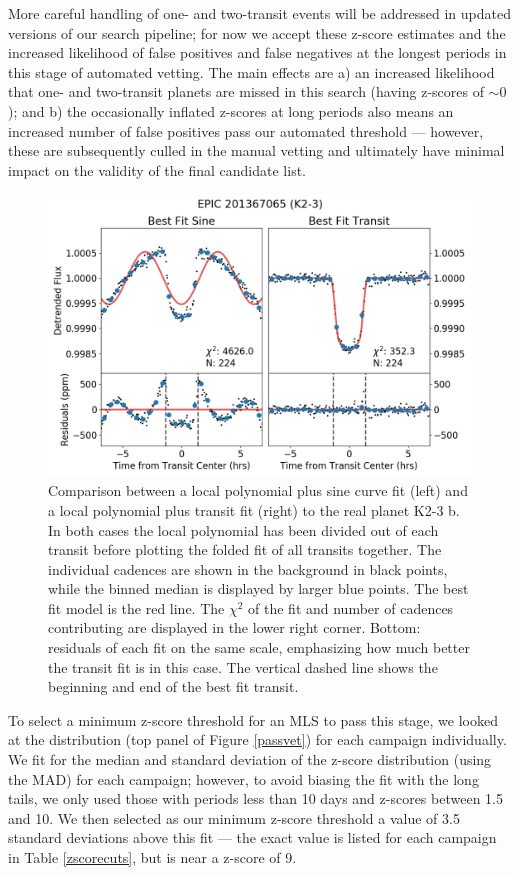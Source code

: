 \documentclass[twocolumn]{aastex62}
\begin{document}
More careful handling of one- and two-transit events will be addressed
in updated versions of our search pipeline; for now we accept these
z-score estimates and the increased likelihood of false positives and
false negatives at the longest periods in this stage of automated
vetting. The main effects are a) an increased likelihood that one- and
two-transit planets are missed in this search (having z-scores of
$\sim0$); and b) the occasionally inflated z-scores at long periods
also means an increased number of false positives pass our automated
threshold --- however, these are subsequently culled in the manual
vetting and ultimately have minimal impact on the validity of the
final candidate list.

\begin{figure}[tbp]
\includegraphics[width=\textwidth]{sinfit_real.png}
\caption{Comparison between a local polynomial plus sine curve fit
  (left) and a local polynomial plus transit fit (right) to the real
  planet K2-3 b.  In both cases the local polynomial has been divided
  out of each transit before plotting the folded fit of all transits
  together. The individual cadences are shown in the background in
  black points, while the binned median is displayed by larger blue
  points. The best fit model is the red line. The $\chi^2$ of the fit
  and number of cadences contributing are displayed in the lower right
  corner. Bottom: residuals of each fit on the same scale, emphasizing
  how much better the transit fit is in this case. The vertical dashed
  line shows the beginning and end of the best fit
  transit. \label{realtran}}
\end{figure}

To select a minimum z-score threshold for an MLS to pass this stage,
we looked at the distribution (top panel of Figure \ref{passvet}) for
each campaign individually. We fit for the median and standard
deviation of the z-score distribution (using the MAD) for each
campaign; however, to avoid biasing the fit with the long tails, we
only used those with periods less than 10 days and z-scores between
1.5 and 10.  We then selected as our minimum z-score threshold a value
of 3.5 standard deviations above this fit --- the exact value is
listed for each campaign in Table \ref{zscorecuts}, but is near a
z-score of 9.
\end{document}
